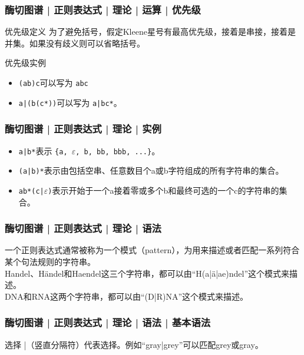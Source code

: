\begin{frame}[fragile]
  \frametitle{酶切图谱 | 正则表达式 | 理论 | 运算 | \alert{优先级}}
  \begin{block}{优先级定义}
    为了避免括号，假定Kleene星号有最高优先级，接着是串接，接着是并集。如果没有歧义则可以省略括号。
  \end{block}
  \pause
  \begin{block}{优先级实例}
    \begin{itemize}
      \item \verb|(ab)c|可以写为 \verb|abc|
      \item \verb=a|(b(c*))=可以写为 \verb=a|bc*=。
    \end{itemize}
  \end{block}
\end{frame}

\begin{frame}[fragile]
  \frametitle{酶切图谱 | 正则表达式 | 理论 | 实例}
  \begin{itemize}
    \item \verb=a|b*=表示 \verb={a, =$\varepsilon$\verb=, b, bb, bbb, ...}=。
    \item \verb=(a|b)*=表示由包括空串、任意数目个a或b字符组成的所有字符串的集合。
    \item \verb=ab*(c|=$\varepsilon$\verb=)=表示开始于一个a接着零或多个b和最终可选的一个c的字符串的集合。
  \end{itemize}
\end{frame}

\begin{frame}[fragile]
  \frametitle{酶切图谱 | 正则表达式 | 理论 | 语法}
  \alert{一个正则表达式通常被称为一个模式（pattern），为用来描述或者匹配一系列符合某个句法规则的字符串。}\\
  \vspace{1em}
  Handel、Händel和Haendel这三个字符串，都可以由“H(a|ä|ae)ndel”这个模式来描述。\\
  \vspace{1em}
  DNA和RNA这两个字符串，都可以由“(D|R)NA”这个模式来描述。
\end{frame}

\begin{frame}
  \frametitle{酶切图谱 | 正则表达式 | 理论 | 语法 | \alert{基本语法}}
  \begin{block}{选择}
    |（竖直分隔符）代表选择。例如“gray|grey”可以匹配grey或gray。
  \end{block}
\end{frame}

